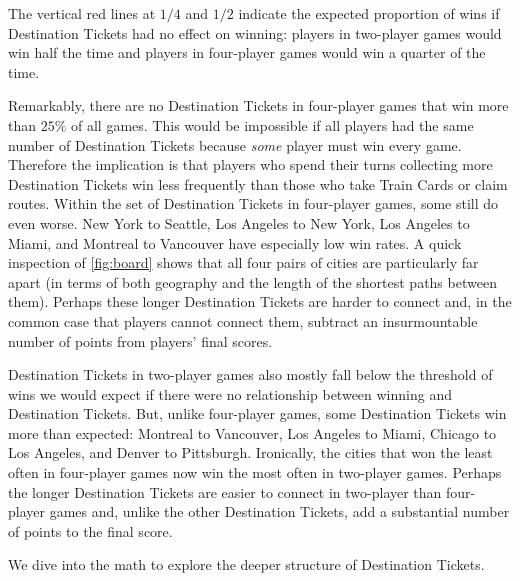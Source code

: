 \begin{multicols}{2}

The vertical red lines at $1/4$ and $1/2$ indicate
the expected proportion of wins if Destination Tickets
had no effect on winning: players in two-player games
would win half the time and players in four-player games
would win a quarter of the time.

Remarkably, there are no Destination Tickets in four-player
games that win more than $25\%$ of all games.
This would be impossible if all players had the same number
of Destination Tickets because \textit{some} player must win every
game.
Therefore the implication is that players who spend their
turns collecting more Destination Tickets win less frequently
than those who take Train Cards or claim routes.
Within the set of Destination Tickets in four-player games,
some still do even worse.
New York to Seattle, Los Angeles to New York, Los Angeles to Miami,
and Montreal to Vancouver have especially low win rates.
A quick inspection of \cref{fig:board} shows that all four pairs of cities
are particularly far apart (in terms of both geography and the
length of the shortest paths between them).
Perhaps these longer Destination Tickets are harder to connect and,
in the common case that players cannot connect them, subtract an insurmountable
number of points from players' final scores.

Destination Tickets in two-player games also mostly fall
below the threshold of wins we would expect if there were
no relationship between winning and Destination Tickets.
But, unlike four-player games, some Destination Tickets
win more than expected: Montreal to Vancouver,
Los Angeles to Miami, Chicago to Los Angeles, and
Denver to Pittsburgh.
Ironically, the cities that won the least often in four-player
games now win the most often in two-player games.
Perhaps the longer Destination Tickets are easier
to connect in two-player than four-player games
and, unlike the other Destination Tickets, add
a substantial number of points to the final score.

We dive into the math to explore the deeper structure
of Destination Tickets.


\end{multicols}
